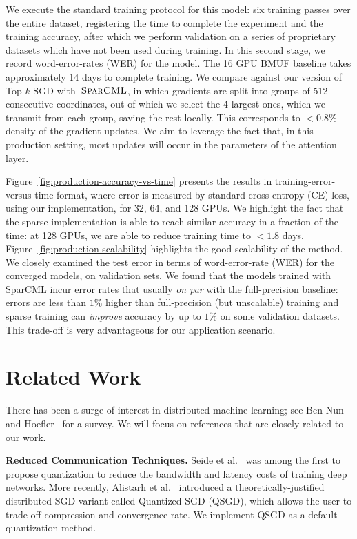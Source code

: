 \documentclass[11pt]{article}
\renewcommand{\paragraph}[1]{\vspace{0.1em} \noindent \textbf{#1}}
\newcommand{\mml}{$\textsc{SparCML}$}
\begin{document}
We execute the standard training protocol for this model: six training passes over the entire dataset, registering the time to complete the experiment and the training accuracy, after which we perform validation on a series of proprietary datasets which have not been used during training. In this second stage, we record word-error-rates (WER) for the model. 
The 16 GPU BMUF baseline takes approximately 14 days to complete training. 
We compare against our version of Top-$k$ SGD with~\mml{}, in which gradients are split into groups of 512 consecutive coordinates, out of which we select the 4 largest ones, which we transmit from each group, saving the rest locally. 
This corresponds to $<0.8\%$ density of the gradient updates. We aim to leverage the fact that, in this production setting, most updates will occur in the parameters of the attention layer. 

Figure~\ref{fig:production-accuracy-vs-time} presents the results in training-error-versus-time format, where error is measured by standard cross-entropy (CE) loss, using our implementation, for 32, 64, and 128 GPUs. 
We highlight the fact that the sparse implementation is able to reach similar accuracy in a fraction of the time: at 128 GPUs, we are able to reduce training time to $<1.8$ days.  
Figure~\ref{fig:production-scalability} highlights the good scalability of the method. 
We closely examined the test error in terms of word-error-rate (WER) for the converged models, on validation sets. 
We found that the models trained with SparCML incur error rates that usually \emph{on par} with the full-precision baseline: errors are less than $1\%$ higher than full-precision (but unscalable) training and sparse training can \emph{improve} accuracy by up to $1\%$ on some validation datasets.   
This trade-off is very advantageous for our application scenario. 

\section{Related Work}

There has been a surge of interest in distributed machine learning; see Ben-Nun and Hoefler~\cite{distdl-preprint} for a survey. We will focus on references that are closely related to our work. 

\paragraph{Reduced Communication Techniques.} 
Seide et al.~\cite{seide20141} was among the first to propose quantization to reduce the bandwidth and latency costs of training deep networks. 
More recently, Alistarh et al.~\cite{alistarh2016qsgd} introduced a theoretically-justified distributed SGD variant called Quantized SGD (QSGD), which allows the user to trade off compression and convergence rate. 
We implement QSGD as a default quantization method.  
\end{document}
